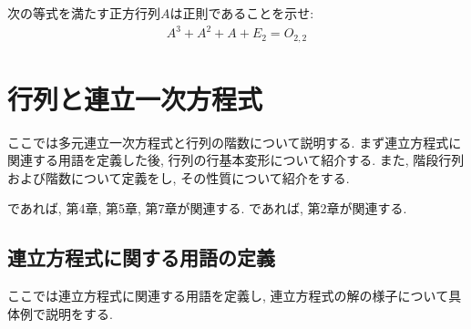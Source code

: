 \begin{quiz}
  次の等式を満たす正方行列$A$は正則であることを示せ:
  \begin{align*}
    A^3+A^2+A+E_2=O_{2,2}
  \end{align*}
\end{quiz}



\chapter{行列と連立一次方程式}
\label{chap:systemoflineq}
ここでは多元連立一次方程式と行列の階数について説明する.
まず連立方程式に関連する用語を定義した後,
行列の行基本変形について紹介する.
また, 階段行列および階数について定義をし,
その性質について紹介をする.

\cite{978-4-7806-0772-7}であれば,
第4章, 第5章, 第7章が関連する.
\cite{978-4-7806-0164-0}であれば,
第2章が関連する.


\section{連立方程式に関する用語の定義}
ここでは連立方程式に関連する用語を定義し,
連立方程式の解の様子について具体例で説明をする.

